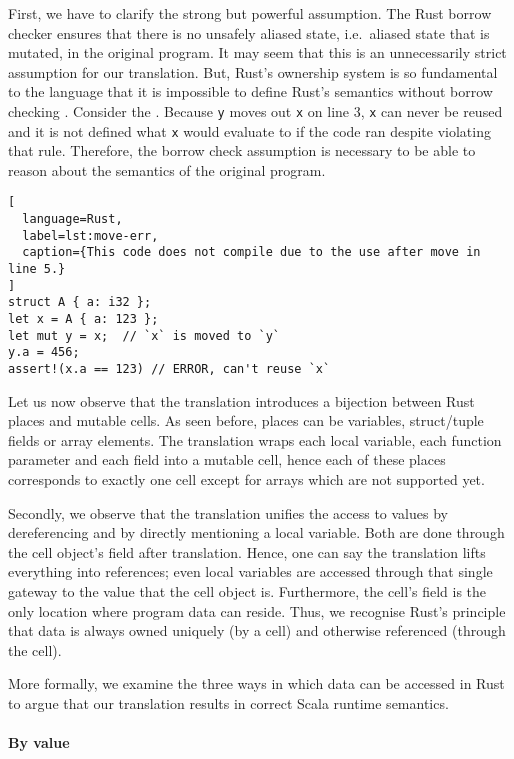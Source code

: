 First, we have to clarify the strong but powerful assumption. The Rust
borrow checker ensures that there is no unsafely aliased state,
i.e.~aliased state that is mutated, in the original program. It may seem
that this is an unnecessarily strict assumption for our translation.
But, Rust's ownership system is so fundamental to the language that it
is impossible to define Rust's semantics without borrow checking
\cite{krust}. Consider the . Because
\passthrough{\lstinline!y!} moves out \passthrough{\lstinline!x!} on
line 3, \passthrough{\lstinline!x!} can never be reused and it is not
defined what \passthrough{\lstinline!x!} would evaluate to if the code
ran despite violating that rule. Therefore, the borrow check assumption
is necessary to be able to reason about the semantics of the original
program.

\begin{lstlisting}[
  language=Rust,
  label=lst:move-err,
  caption={This code does not compile due to the use after move in line 5.}
]
struct A { a: i32 };
let x = A { a: 123 };
let mut y = x;  // `x` is moved to `y`
y.a = 456;
assert!(x.a == 123) // ERROR, can't reuse `x`
\end{lstlisting}

Let us now observe that the translation introduces a bijection between
Rust places and mutable cells. As seen before, places can be variables,
struct/tuple fields or array elements. The translation wraps each local
variable, each function parameter and each field into a mutable cell,
hence each of these places corresponds to exactly one cell except for
arrays which are not supported yet.

Secondly, we observe that the translation unifies the access to values
by dereferencing and by directly mentioning a local variable. Both are
done through the cell object's field after translation. Hence, one can
say the translation lifts everything into references; even local
variables are accessed through that single gateway to the value that the
cell object is. Furthermore, the cell's field is the only location where
program data can reside. Thus, we recognise Rust's principle that data
is always owned uniquely (by a cell) and otherwise referenced (through
the cell).

More formally, we examine the three ways in which data can be accessed
in Rust to argue that our translation results in correct Scala runtime
semantics.

\paragraph{By value}
\label{sec:correctness-by-value}


